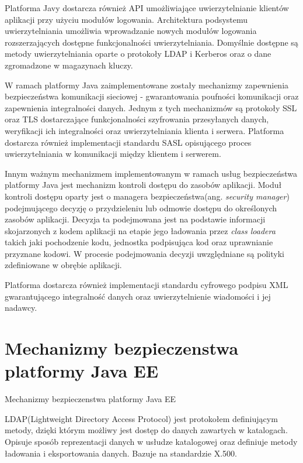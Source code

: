 		Platforma Javy dostarcza również API umożliwiające uwierzytelnianie klientów aplikacji przy użyciu modułów logowania. Architektura podsystemu uwierzytelniania umożliwia wprowadzanie nowych modułów logowania rozszerzających dostępne funkcjonalności uwierzytelniania. Domyślnie dostępne są metody uwierzytelniania oparte o protokoły LDAP i Kerberos oraz o dane zgromadzone w magazynach kluczy.

		W ramach platformy Java zaimplementowane zostały mechanizmy zapewnienia bezpieczeństwa komunikacji sieciowej - gwarantowania poufności komunikacji oraz zapewnienia integralności danych. Jednym z tych mechanizmów są protokoły SSL oraz TLS dostarczające funkcjonalności  szyfrowania przesyłanych danych, weryfikacji ich integralności oraz uwierzytelniania klienta i serwera. Platforma dostarcza również implementacji standardu SASL opisującego proces uwierzytelniania w komunikacji między klientem i serwerem. 

		Innym ważnym mechanizmem implementowanym w ramach usług bezpieczeństwa platformy Java jest mechanizm kontroli dostępu do zasobów aplikacji. Moduł kontroli dostępu oparty jest o managera bezpieczeństwa(ang. \textit{security manager})  podejmującego decyzję o przydzieleniu lub odmowie dostępu do określonych zasobów aplikacji. Decyzja ta podejmowana jest na podstawie informacji skojarzonych z kodem aplikacji na etapie jego ładowania przez \textit{class loadera}  takich jaki pochodzenie kodu, jednostka podpisująca kod oraz uprawnianie przyznane kodowi. W procesie podejmowania decyzji uwzględniane są polityki zdefiniowane w obrębie aplikacji. 

		Platforma dostarcza również implementacji standardu cyfrowego podpisu XML gwarantującego integralność danych oraz uwierzytelnienie wiadomości i jej nadawcy.
	


\section{Mechanizmy bezpieczenstwa platformy Java EE}
\label{sec:javaEE}

Mechanizmy bezpieczenstwa platformy Java EE


\label{sec:ldap}

	LDAP(Lightweight Directory Access Protocol) jest protokołem definiującym metody, dzięki którym możliwy jest dostęp do danych zawartych w katalogach\cite{ZyTrax13}. Opisuje sposób reprezentacji danych w usłudze katalogowej oraz definiuje metody ładowania i eksportowania danych. Bazuje na standardzie X.500.

